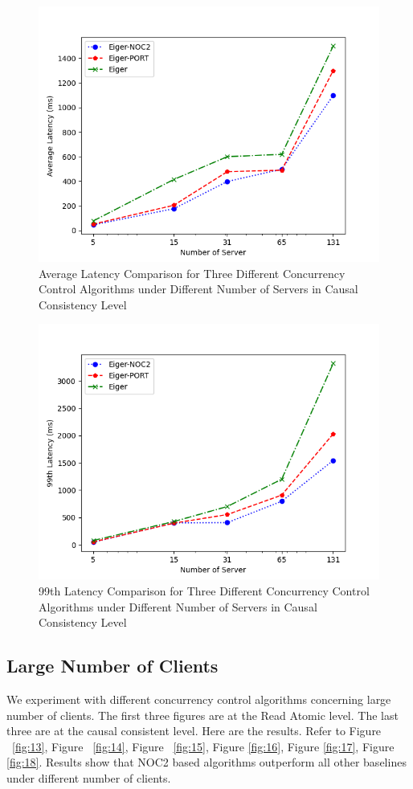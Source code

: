 \begin{figure}[H]
    \centering
    \includegraphics[width=0.8\linewidth]{figure/3-tcc-al.png}
    \caption{Average Latency Comparison for Three Different Concurrency Control Algorithms under Different Number of Servers in Causal Consistency Level}
    \label{fig:11}
\end{figure}


\begin{figure}[H]
    \centering
    \includegraphics[width=0.8\linewidth]{figure/3-tcc-l.png}
    \caption{99th Latency Comparison for Three Different Concurrency Control Algorithms under Different Number of Servers in Causal Consistency Level}
    \label{fig:12}
\end{figure}


\newpage


\subsection{Large Number of Clients}
We experiment with different concurrency control algorithms concerning large number of clients. The first three figures are at the Read Atomic level. The last three are at the causal consistent level. Here are the results. Refer to Figure ~\ref{fig:13}, Figure ~\ref{fig:14}, Figure ~\ref{fig:15}, Figure \ref{fig:16}, Figure \ref{fig:17}, Figure \ref{fig:18}. Results show that NOC2 based algorithms outperform all other baselines under different number of clients. 



